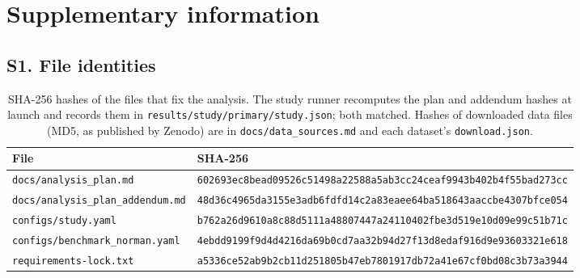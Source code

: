 \section*{Supplementary information}
\renewcommand{\thetable}{S\arabic{table}}
\renewcommand{\thefigure}{S\arabic{figure}}
\setcounter{table}{0}
\setcounter{figure}{0}

\subsection*{S1. File identities}
\begin{table}[H]
\centering\scriptsize
\caption{SHA-256 hashes of the files that fix the analysis. The study runner recomputes the plan and addendum hashes at launch and records them in \texttt{results/study/primary/study.json}; both matched. Hashes of downloaded data files (MD5, as published by Zenodo) are in \texttt{docs/data\_sources.md} and each dataset's \texttt{download.json}.}
\label{tab:hashes}
\begin{tabular}{ll}
\toprule
File & SHA-256 \\
\midrule
\texttt{docs/analysis\_plan.md} & \texttt{602693ec8bead09526c51498a22588a5ab3cc24ceaf9943b402b4f55bad273cc} \\
\texttt{docs/analysis\_plan\_addendum.md} & \texttt{48d36c4965da3155e3adb6fdfd14c2a83eaee64ba518643aaccbe4307bfce054} \\
\texttt{configs/study.yaml} & \texttt{b762a26d9610a8c88d5111a48807447a24110402fbe3d519e10d09e99c51b71c} \\
\texttt{configs/benchmark\_norman.yaml} & \texttt{4ebdd9199f9d4d4216da69b0cd7aa32b94d27f13d8edaf916d9e93603321e618} \\
\texttt{requirements-lock.txt} & \texttt{a5336ce52ab9b2cb11d251805b47eb7801917db72a41e67cf0bd08c3b73a3944} \\
\bottomrule
\end{tabular}
\end{table}

